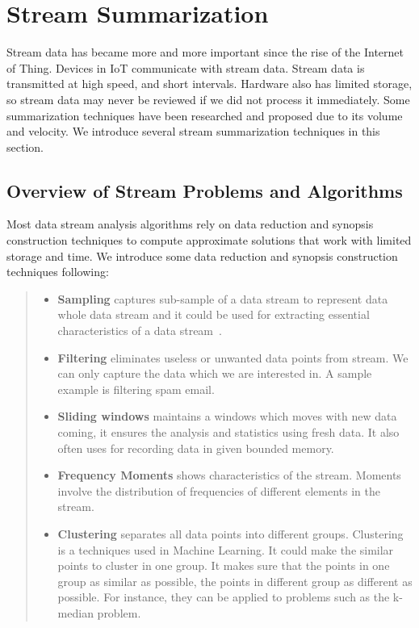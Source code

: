 \section{Stream Summarization}

Stream data has became more and more important since the rise of the Internet of
Thing. Devices in IoT communicate with stream data. Stream data is transmitted
at high speed, and short intervals. Hardware also has limited storage, so
stream data may never be reviewed if we did not process it immediately. Some
summarization techniques have been researched and proposed due to its volume and
velocity. We introduce several stream summarization techniques in this section.

\subsection{Overview of Stream Problems and Algorithms}
Most data stream analysis algorithms rely on data reduction and synopsis
construction techniques to compute approximate solutions that work with limited
storage and time. We introduce some data reduction and synopsis construction
techniques following:
\begin{quote}
\begin{itemize}
    \item  \textbf{Sampling} captures sub-sample of a data stream to represent
    data whole data stream and it could be used for extracting essential
    characteristics of a data stream~\cite{kejariwal2015real}.
    
    \item \textbf{Filtering} eliminates useless or unwanted data points from
    stream. We can only capture the data which we are interested in. A sample
    example is filtering spam email.
    
    \item \textbf{Sliding windows} maintains a windows which moves with new data
    coming, it ensures the analysis and statistics using fresh data. It also 
    often uses for recording data in given bounded memory.

    \item \textbf{Frequency Moments} shows characteristics of the stream.
    Moments involve the distribution of frequencies of different elements in
    the stream. 
    
    
    \item \textbf{Clustering} separates all data points into different groups.
    Clustering is a techniques used in Machine Learning. It could make the 
    similar points to cluster in one group. It makes sure that the points in one
    group as similar as possible, the points in different group as different as
    possible. For instance, they can be applied to problems such as the k-median 
    problem. 

\end{itemize}
\end{quote}

